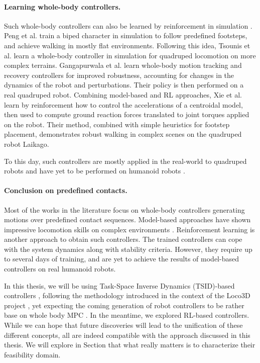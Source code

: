 \paragraph{Learning whole-body controllers.}
Such whole-body controllers can also be learned by reinforcement in simulation \cite{ALLSTEPS_2020}.
Peng et al. \cite{deepLoco} train a biped character in simulation to follow predefined footsteps, and achieve walking in mostly flat environments.
Following this idea, Tsounis et al. \cite{deepGait} learn a whole-body controller in simulation for quadruped locomotion on more complex terrains. 
Gangapurwala et al. \cite{RLOC} learn whole-body motion tracking and recovery controllers for improved robustness, accounting for changes in the dynamics of the robot and perturbations. Their policy is then performed on a real quadruped robot.
Combining model-based and RL approaches, Xie et al. \cite{glide_xie_2021} learn by reinforcement how to control the accelerations of a centroidal model, then used to compute ground reaction forces translated to joint torques applied on the robot.
Their method, combined with simple heuristics for footstep placement, demonstrates robust walking in complex scenes on the quadruped robot Laikago. %

To this day, such controllers are mostly applied in the real-world to quadruped robots and have yet to be performed on humanoid robots \cite{papier_rohan_wbc_rl_2022}.

\paragraph{Conclusion on predefined contacts.}
Most of the works in the literature focus on whole-body controllers generating motions over predefined contact sequences.
Model-based approaches have shown impressive locomotion skills on complex environments \cite{ladder_robot_2}.
Reinforcement learning is another approach to obtain such controllers. 
The trained controllers can cope with the system dynamics along with stability criteria. 
However, they require up to several days of training, and are yet to achieve the results of model-based controllers on real humanoid robots.

In this thesis, we will be using Task-Space Inverse Dynamics (TSID)-based controllers \cite{tsid_prete}, following the methodology introduced in the context of the Loco3D project \cite{loco3d}, yet expecting the coming generation of robot controllers to be rather base on whole body MPC \cite{ewen_2022}.
In the meantime, we explored RL-based controllers.
While we can hope that future discoveries will lead to the unification of these different concepts, all are indeed compatible with the approach discussed in this thesis.
We will explore in Section \cite{sota2} that what really matters is to characterize their feasibility domain. 


